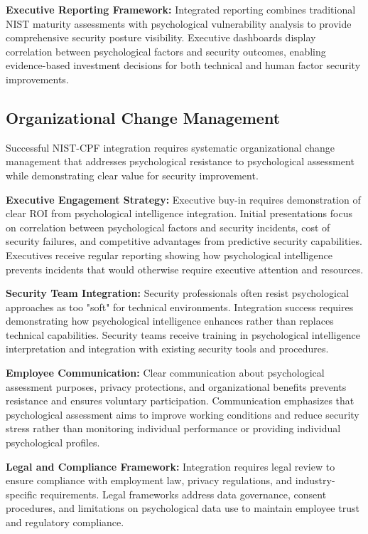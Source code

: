 \documentclass[10pt, twocolumn]{article}
\begin{document}
\textbf{Executive Reporting Framework:} Integrated reporting combines traditional NIST maturity assessments with psychological vulnerability analysis to provide comprehensive security posture visibility. Executive dashboards display correlation between psychological factors and security outcomes, enabling evidence-based investment decisions for both technical and human factor security improvements.

\subsection{Organizational Change Management}

Successful NIST-CPF integration requires systematic organizational change management that addresses psychological resistance to psychological assessment while demonstrating clear value for security improvement.

\textbf{Executive Engagement Strategy:} Executive buy-in requires demonstration of clear ROI from psychological intelligence integration. Initial presentations focus on correlation between psychological factors and security incidents, cost of security failures, and competitive advantages from predictive security capabilities. Executives receive regular reporting showing how psychological intelligence prevents incidents that would otherwise require executive attention and resources.

\textbf{Security Team Integration:} Security professionals often resist psychological approaches as too "soft" for technical environments. Integration success requires demonstrating how psychological intelligence enhances rather than replaces technical capabilities. Security teams receive training in psychological intelligence interpretation and integration with existing security tools and procedures.

\textbf{Employee Communication:} Clear communication about psychological assessment purposes, privacy protections, and organizational benefits prevents resistance and ensures voluntary participation. Communication emphasizes that psychological assessment aims to improve working conditions and reduce security stress rather than monitoring individual performance or providing individual psychological profiles.

\textbf{Legal and Compliance Framework:} Integration requires legal review to ensure compliance with employment law, privacy regulations, and industry-specific requirements. Legal frameworks address data governance, consent procedures, and limitations on psychological data use to maintain employee trust and regulatory compliance.
\end{document}
